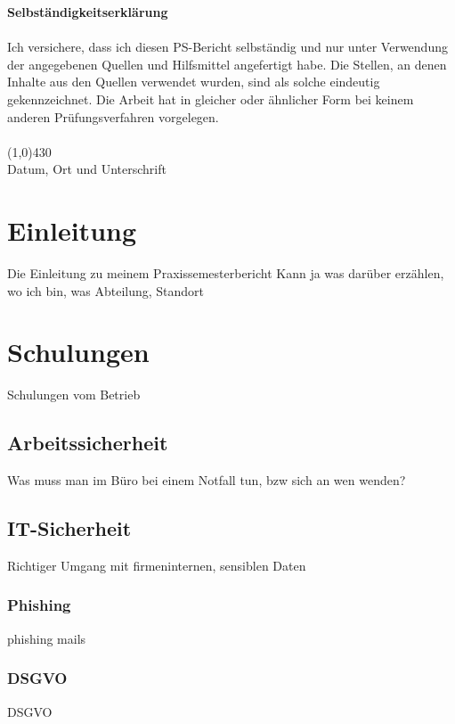 \documentclass[a4paper, 12pt]{article}
\begin{document}
\newpage
\tableofcontents            %
\newpage                    %

{\bfseries Selbständigkeitserklärung}\\ \\
Ich versichere, dass ich diesen PS-Bericht selbständig und nur unter Verwendung der angegebenen
Quellen und Hilfsmittel angefertigt habe. Die Stellen, an denen Inhalte aus den Quellen verwendet
wurden, sind als solche eindeutig gekennzeichnet. Die Arbeit hat in gleicher oder ähnlicher Form bei
keinem anderen Prüfungsverfahren vorgelegen. \\
\vspace{1.0cm} \\
\line(1,0){430} \\
Datum, Ort und Unterschrift\\

\newpage
\section{Einleitung}\label{Einleitung} 
Die Einleitung zu meinem Praxissemesterbericht
Kann ja was darüber erzählen, wo ich bin, was Abteilung, Standort

\newpage
\section{Schulungen}\label{Schulungen}
Schulungen vom Betrieb

\subsection{Arbeitssicherheit}\label{Arbeitssicherheit}
Was muss man im Büro bei einem Notfall tun, bzw sich an wen wenden?

\subsection{IT-Sicherheit}\label{IT-Sicherheit}
Richtiger Umgang mit firmeninternen, sensiblen Daten

\subsubsection{Phishing}\label{Phishing}
phishing mails

\subsubsection{DSGVO}\label{DSGVO}
DSGVO \cite{dsgvo2024}
\end{document}
